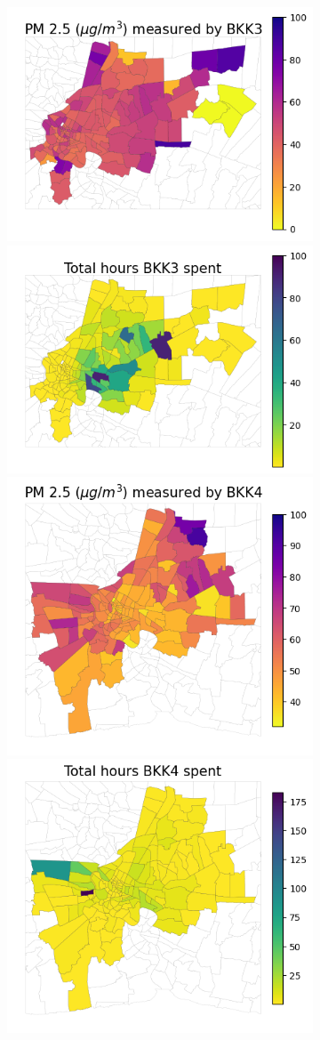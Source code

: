 \documentclass[sigconf,screen,natbib=true]{acmart}
\begin{document}
\begin{figure}
\begin{subfigure}[t]{0.49\textwidth}
        \includegraphics[width=.5\linewidth]{figures/map/BKK3_PM25.png}\includegraphics[width=.5\linewidth]{figures/map/BKK3_time.png}
        \includegraphics[width=.5\linewidth]{figures/map/BKK4_PM25.png}\includegraphics[width=.5\linewidth]{figures/map/BKK4_time.png}

\end{subfigure}
\end{figure}
\end{document}
